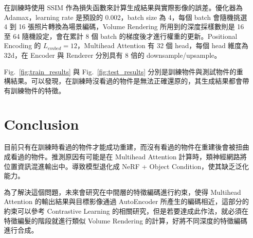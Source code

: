 \documentclass[10pt,twocolumn,letterpaper]{article}
\begin{document}
\begin{CJK}{UTF8}{bkai}
   在訓練時使用 SSIM\cite{SSIM} 作為損失函數來計算生成結果與實際影像的誤差。優化器為 Adamax，learning rate 是預設的 0.002，batch size 為 4，每個 batch 會隨機挑選 4 到 16
   張照片轉換為場景編碼，Volume Rendering 所用到的深度採樣數則是 16 至 64 隨機設定，會在累計 8 個 batch 的梯度後才進行權重的更新。Positional Encoding 的
   $L_{embed}=12$，Multihead Attention 有 32 個 head，每個 head 維度為 32d，在 Encoder 與 Renderer 分別具有 8 倍的 downsample/upsample。

   Fig.~\ref{fig:train_results} 與 Fig.~\ref{fig:test_results}
   分別是訓練物件與測試物件的重構結果。可以發現，在訓練時沒看過的物件是無法正確還原的，其生成結果都會帶有訓練物件的特徵。

   \section{Conclusion}
   目前只有在訓練時看過的物件才能成功重建，而沒有看過的物件在重建後會被扭曲成看過的物件。推測原因有可能是在
   Multihead Attention 計算時，類神經網路將位置資訊混進輸出中。導致模型退化成 NeRF + Object Condition，使其缺乏泛化能力。

   為了解決這個問題，未來會研究在中間層的特徵編碼進行約束，使得 Multihead Attention 的輸出結果與目標影像通過 AutoEncoder
   所產生的編碼相近，這部分的約束可以參考 Contrastive Learning 的相關研究，但是若要達成此作法，就必須在特徵編髮的階段就進行類似
   Volume Rendering 的計算，好將不同深度的特徵編碼進行合成。

   {\small
   
   
   }



\end{CJK}
\end{document}
